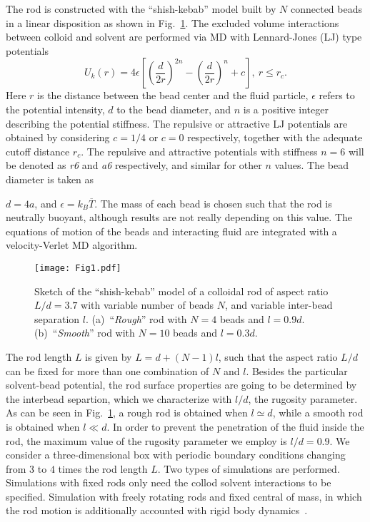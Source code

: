 \documentclass[aps,pre,twocolumn,showpacs,superscriptaddress]{revtex4-1}
\begin{document}
The rod is constructed with the ``shish-kebab'' model built by $N$
connected beads in a linear disposition as shown in Fig.~\ref{model}.
The excluded volume interactions between colloid and solvent are
performed via MD with Lennard-Jones (LJ) type
potentials~\cite{vliegent99,luese12jpcm}
\begin{equation}\label{lj}
U_k(r) =
4\epsilon\left[\left(\frac{d}{2r}\right)^{2n}
  -\left(\frac{d}{2r}\right)^{n}+c\right], \  r\leq r_c. 
\end{equation}
Here $r$ is the distance between the bead center and the fluid
particle, $\epsilon$ refers to the potential intensity, $d$ to the
bead diameter, and $n$ is a positive integer describing the potential
stiffness. The repulsive or attractive LJ potentials are obtained by
considering $c=1/4$ or $c=0$ respectively, together with the adequate
cutoff distance $r_c$. The repulsive and attractive potentials with
stiffness $n=6$ will be denoted as {\em r6} and {\em a6} respectively,
and similar for other $n$ values. The bead diameter is taken as

$d=4a$, and $\epsilon=k_{B}\overline{T}$.  The mass of each
  bead is chosen such that the rod is neutrally buoyant, although
  results are not really depending on this value.  The equations of
motion of the beads and interacting fluid are integrated with a
velocity-Verlet MD algorithm. %
\begin{figure}[h]
\texttt{[image: Fig1.pdf]}
  \caption{Sketch of the ``shish-kebab'' model of a colloidal rod of
    aspect ratio $L/d=3.7$ with variable number of beads $N$, and
    variable inter-bead separation $l$.  (a)~``\textit{Rough}'' rod
    with $N=4$ beads and $l=0.9d$. (b)~``\textit{Smooth}'' rod with
    $N=10$ beads and $l=0.3d$.}
  \label{model}
\end{figure}
The rod length $L$ is given by $L=d+(N-1)l$, such that the aspect
ratio $L/d$ can be fixed for more than one combination of $N$ and $l$.
Besides the particular solvent-bead potential, the rod surface
properties are going to be determined by the interbead separtion,
which we characterize with $l/d$, the rugosity parameter. As can be
seen in Fig.~\ref{model}, a rough rod is obtained when $l\simeq d$,
while a smooth rod is obtained when $l\ll d$. In order to prevent the
penetration of the fluid inside the rod, the maximum value of the
rugosity parameter we employ is $l/d = 0.9 $.  We consider a
three-dimensional box with periodic boundary conditions changing from
$3$ to $4$ times the rod length $L$.  Two types of simulations
  are performed. Simulations with fixed rods only need the collod
  solvent interactions to be specified. Simulation with freely
  rotating rods and fixed central of mass, in which the rod motion is
  additionally accounted with rigid body dynamics~\cite{allen}.
\end{document}
